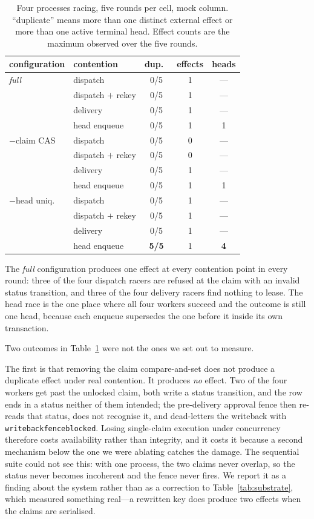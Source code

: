 \documentclass[acmsmall,manuscript,review,anonymous]{acmart}
\renewcommand{\_}{\discretionary{\textunderscore}{}{\textunderscore}}
\begin{document}
\begin{table}[t]
\centering
\small
\caption{Four processes racing, five rounds per cell, mock column. ``duplicate''
means more than one distinct external effect or more than one active terminal
head. Effect counts are the maximum observed over the five rounds.}
\label{tab:concurrency}
\begin{tabular}{@{}llccc@{}}
\hline
configuration & contention & dup.\ & effects & heads\\
\hline
\emph{full} & dispatch          & 0/5 & 1 & ---\\
            & dispatch $+$ rekey& 0/5 & 1 & ---\\
            & delivery          & 0/5 & 1 & ---\\
            & head enqueue      & 0/5 & 1 & 1\\
\hline
$-$claim CAS & dispatch          & 0/5 & 0 & ---\\
             & dispatch $+$ rekey& 0/5 & 0 & ---\\
             & delivery          & 0/5 & 1 & ---\\
             & head enqueue      & 0/5 & 1 & 1\\
\hline
$-$head uniq.\ & dispatch        & 0/5 & 1 & ---\\
               & dispatch $+$ rekey& 0/5 & 1 & ---\\
               & delivery        & 0/5 & 1 & ---\\
               & head enqueue    & \textbf{5/5} & 1 & \textbf{4}\\
\hline
\end{tabular}
\end{table}

The \emph{full} configuration produces one effect at every contention
point in every round: three of the four
dispatch racers are refused at the claim with an invalid status transition, and
three of the four delivery racers find nothing to lease. The head race is the one
place where all four workers succeed and the outcome is still one head, because
each enqueue supersedes the one before it inside its own transaction.

Two outcomes in Table~\ref{tab:concurrency} were not the ones we set out to
measure.

The first is that removing the claim compare-and-set does not produce a duplicate
effect under real contention. It produces \emph{no} effect. Two of the four
workers get past the unlocked claim, both write a status transition, and the row
ends in a status neither of them intended; the pre-delivery approval fence then
re-reads that status, does not recognise it, and dead-letters the writeback with
\texttt{writeback\_fence\_blocked}. Losing single-claim execution under
concurrency therefore costs availability rather than integrity, and it costs it
because a second mechanism below the one we were ablating catches the damage. The
sequential suite could not see this: with one process, the two claims never
overlap, so the status never becomes incoherent and the fence never fires. We
report it as a finding about the system rather than as a correction to
Table~\ref{tab:substrate}, which measured something real---a rewritten key does
produce two effects when the claims are serialised.
\end{document}
